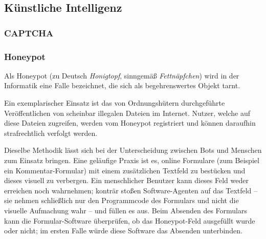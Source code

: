\subsection{Künstliche Intelligenz} %
\label{sub:kunstliche_intelligenz}
\subsubsection{CAPTCHA} %
\label{ssub:captcha}


\subsubsection{Honeypot} %
\label{ssub:honeypot}
Als Honeypot (zu Deutsch \emph{Honigtopf}, sinngemäß \emph{Fettnäpfchen}) wird in der Informatik eine Falle bezeichnet, die sich als begehrenswertes Objekt tarnt.

Ein exemplarischer Einsatz ist das von Ordnungshütern durchgeführte Veröffentlichen von scheinbar illegalen Dateien im Internet.
Nutzer, welche auf diese Dateien zugreifen, werden vom Honeypot registriert und können daraufhin strafrechtlich verfolgt werden.

Dieselbe Methodik lässt sich bei der Unterscheidung zwischen Bots und Menschen zum Einsatz bringen.
Eine geläufige Praxis ist es, online Formulare (zum Beispiel ein Kommentar-Formular) mit einem zusätzlichen Textfeld zu bestücken und dieses visuell zu verbergen.
Ein menschlicher Benutzer kann dieses Feld weder erreichen noch wahrnehmen; konträr stoßen Software-Agenten auf das Textfeld – sie nehmen schließlich nur den Programmcode des Formulars und nicht die visuelle Aufmachung wahr – und füllen es aus.
Beim Absenden des Formulars kann die Formular-Software überprüfen, ob das Honeypot-Feld ausgefüllt wurde oder nicht; im ersten Falle würde diese Software das Absenden unterbinden.
